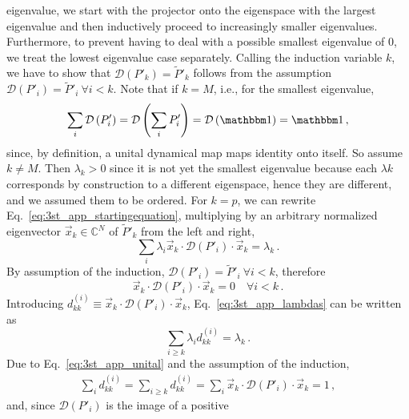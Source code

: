 eigenvalue, we start with the projector onto the eigenspace
with the largest eigenvalue and then inductively proceed to
increasingly smaller eigenvalues. Furthermore, to prevent having to
deal with a possible smallest eigenvalue of $0$, we treat the
lowest eigenvalue case separately.
Calling the induction variable $k$,
we have to show that $\mathcal{D}\left(P'_{k}\right)=\tilde{P}'_{k}$
follows from the assumption
$\mathcal{D}\left(P'_{i}\right)=\tilde{P}'_{i}~\forall
i<k$.
Note that if $k=M$, i.e., for the smallest eigenvalue,
\begin{equation}
\label{eq:3st_app_unital}
\sum_{i}\mathcal{D}\left(P'_{i}\right)
=\mathcal{D}\left(\sum_i P'_{i}\right)
=\mathcal{D}\left(\openone\right)=\openone\,,
\end{equation}
since, by definition, a unital dynamical map maps identity
onto itself. So assume $k\neq M$. Then $\lambda_{k}>0$ since it
is not yet the smallest eigenvalue because each $\lambda{k}$ corresponds
by construction to a different eigenspace, hence they are different, and
we assumed them to be ordered.
For $k=p$, we can rewrite Eq.~\eqref{eq:3st_app_startingequation},
multiplying by an arbitrary normalized eigenvector
$\vec{x}_{k}\in\mathbb{C}^N$ of $\tilde{P}'_{k}$ from the left and right,
\begin{equation}
\label{eq:3st_app_lambdas}
\sum_{i}\lambda_{i}\vec{x}_{k}\cdot\mathcal{D}\left(P'_{i}\right)\cdot\vec{x}_{k}
=\lambda_{k} \,.
\end{equation}
By assumption of the induction,
$\mathcal{D}\left(P'_{i}\right)=\tilde{P}'_{i}~\forall i<k$, therefore
\begin{equation*}
  \vec{x}_{k}\cdot\mathcal{D}\left(P'_{i}\right)\cdot\vec{x}_{k}=0
  \quad \forall i<k\,.
\end{equation*}
Introducing $d_{kk}^{\left(i\right)}
\equiv \vec{x}_{k}\cdot\mathcal{D}\left(P'_{i}\right) \cdot\vec{x}_{k}$,
Eq.~\eqref{eq:3st_app_lambdas} can be written as
\begin{equation}
\label{eq:3st_app_secondequation}
\sum_{i\geq k}\lambda_{i}d_{kk}^{\left(i\right)}=\lambda_{k} \,.
\end{equation}
Due to Eq.~\eqref{eq:3st_app_unital} and the assumption of the induction,
\begin{eqnarray*}
\sum_{i}d_{kk}^{\left(i\right)}
=\sum_{i\geq k}d_{kk}^{\left(i\right)}
=\sum_{i}\vec{x}_{k}\cdot\mathcal{D}\left(P'_{i}\right)\cdot\vec{x}_{k}
= 1\,,
\end{eqnarray*}
and, since $\mathcal{D}\left(P'_{i}\right)$ is the image of a positive
